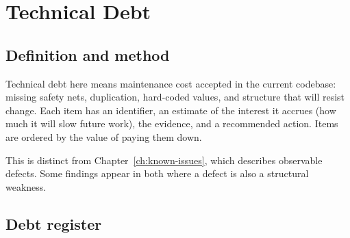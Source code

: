 \chapter{Technical Debt}
\label{ch:technical-debt}

\section{Definition and method}

Technical debt here means maintenance cost accepted in the current codebase:
missing safety nets, duplication, hard-coded values, and structure that will
resist change. Each item has an identifier, an estimate of the interest it
accrues (how much it will slow future work), the evidence, and a recommended
action. Items are ordered by the value of paying them down.

This is distinct from Chapter~\ref{ch:known-issues}, which describes observable
defects. Some findings appear in both where a defect is also a structural
weakness.

\section{Debt register}

